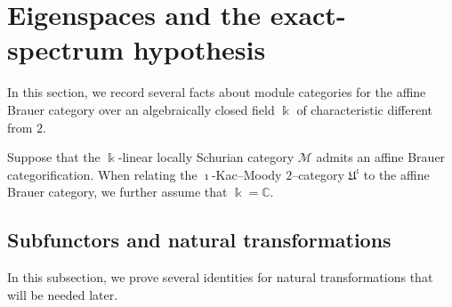 \documentclass[a4,10pt]{amsart}
\numberwithin{equation}{section}
\theoremstyle{definition}
\begin{document}
\section{Eigenspaces and the exact-spectrum hypothesis}\label{Brauer-cate} 
In this section, we record several  facts  about  module categories  for  the  affine Brauer category over an algebraically closed field $\Bbbk$ of  characteristic different from $2$.  


Suppose that the $\Bbbk$-linear locally Schurian  category $\mathcal M$ admits an affine Brauer categorification. 
When  relating  the  $\imath$-Kac--Moody $2$--category $\mathfrak U^\imath$ to the affine Brauer category, we further  assume  that $\Bbbk=\mathbb C$.



\subsection{Subfunctors and natural transformations}  In this subsection,  we prove several identities  for natural transformations that will be needed later. 
\end{document}
